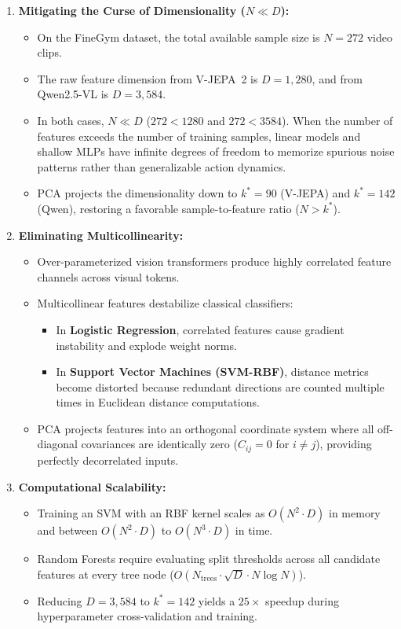 \documentclass[11pt, a4paper]{article}
\begin{document}
\begin{enumerate}[leftmargin=1.5em]
    \item \textbf{Mitigating the Curse of Dimensionality ($N \ll D$):}
    \begin{itemize}
        \item On the FineGym dataset, the total available sample size is $N=272$ video clips.
        \item The raw feature dimension from V-JEPA~2 is $D=1{,}280$, and from Qwen2.5-VL is $D=3{,}584$.
        \item In both cases, $N \ll D$ ($272 < 1280$ and $272 < 3584$). When the number of features exceeds the number of training samples, linear models and shallow MLPs have infinite degrees of freedom to memorize spurious noise patterns rather than generalizable action dynamics.
        \item PCA projects the dimensionality down to $k^*=90$ (V-JEPA) and $k^*=142$ (Qwen), restoring a favorable sample-to-feature ratio ($N > k^*$).
    \end{itemize}

    \item \textbf{Eliminating Multicollinearity:}
    \begin{itemize}
        \item Over-parameterized vision transformers produce highly correlated feature channels across visual tokens.
        \item Multicollinear features destabilize classical classifiers:
        \begin{itemize}
            \item In \textbf{Logistic Regression}, correlated features cause gradient instability and explode weight norms.
            \item In \textbf{Support Vector Machines (SVM-RBF)}, distance metrics become distorted because redundant directions are counted multiple times in Euclidean distance computations.
        \end{itemize}
        \item PCA projects features into an orthogonal coordinate system where all off-diagonal covariances are identically zero ($C_{ij} = 0$ for $i \ne j$), providing perfectly decorrelated inputs.
    \end{itemize}

    \item \textbf{Computational Scalability:}
    \begin{itemize}
        \item Training an SVM with an RBF kernel scales as $O(N^2 \cdot D)$ in memory and between $O(N^2 \cdot D)$ to $O(N^3 \cdot D)$ in time.
        \item Random Forests require evaluating split thresholds across all candidate features at every tree node ($O(N_{\text{trees}} \cdot \sqrt{D} \cdot N \log N)$).
        \item Reducing $D=3{,}584$ to $k^*=142$ yields a $25\times$ speedup during hyperparameter cross-validation and training.
    \end{itemize}
\end{enumerate}
\end{document}
